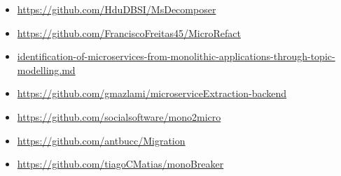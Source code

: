 \begin{itemize}
  \item \url{https://github.com/HduDBSI/MsDecomposer} 
  \item \url{https://github.com/FranciscoFreitas45/MicroRefact} 
  \item \url{identification-of-microservices-from-monolithic-applications-through-topic-modelling.md} 
  \item \url{https://github.com/gmazlami/microserviceExtraction-backend} 
  \item \url{https://github.com/socialsoftware/mono2micro} 
  \item \url{https://github.com/antbucc/Migration} 
  \item \url{https://github.com/tiagoCMatias/monoBreaker} 
\end{itemize}
